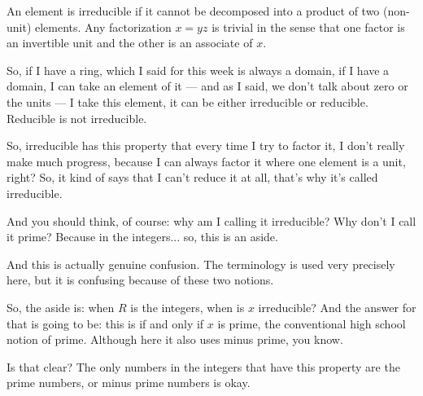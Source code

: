 \begin{content}

\begin{steps}
An element is irreducible if it cannot be decomposed into a product of two  (non-unit) elements. Any factorization $x = yz$ is trivial in the sense that one factor is an invertible unit and the other is an associate of $x$.
\end{steps}
\end{content}

\begin{speech}[00:09:50 - 00:11:05]
So, if I have a ring, which I said for this week is always a domain, if I have a domain, I can take an element of it --- and as I said, we don't talk about zero or the units --- I take this element, it can be either irreducible or reducible. Reducible is not irreducible.

So, irreducible has this property that every time I try to factor it, I don't really make much progress, because I can always factor it where one element is a unit, right? So, it kind of says that I can't reduce it at all, that's why it's called irreducible.

And you should think, of course: why am I calling it irreducible? Why don't I call it prime? Because in the integers... so, this is an aside. \inlinemetanote{writes: [Aside:}

And this is actually genuine confusion. The terminology is used very precisely here, but it is confusing because of these two notions.

So, the aside is: when $R$ is the integers,  when is $x$ irreducible?  And the answer for that is going to be: this is if and only if  $x$ is prime, \inlinemetanote{writes: $x$ is prime]} the conventional high school notion of prime. Although here it also uses minus prime, you know.

Is that clear? The only numbers in the integers that have this property are the prime numbers, or minus prime numbers is okay.
\end{speech}

